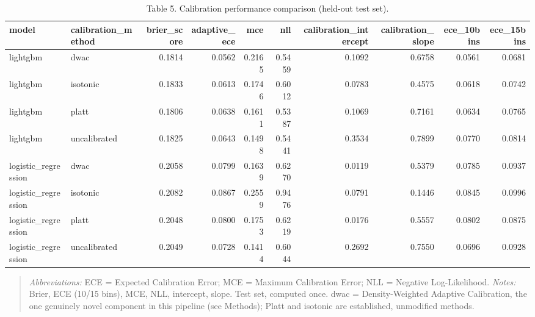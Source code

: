 \begin{table}[htbp]
\centering
\caption{Table 5. Calibration performance comparison (held-out test set).}
\label{table5_calibration_performance_test}
\begin{tabular}{llrrrrrrrr}
\toprule
model & calibration\_method & brier\_score & adaptive\_ece & mce & nll & calibration\_intercept & calibration\_slope & ece\_10bins & ece\_15bins \\
\midrule
lightgbm & dwac & 0.1814 & 0.0562 & 0.2165 & 0.5459 & 0.1092 & 0.6758 & 0.0561 & 0.0681 \\
lightgbm & isotonic & 0.1833 & 0.0613 & 0.1746 & 0.6012 & 0.0783 & 0.4575 & 0.0618 & 0.0742 \\
lightgbm & platt & 0.1806 & 0.0638 & 0.1611 & 0.5387 & 0.1069 & 0.7161 & 0.0634 & 0.0765 \\
lightgbm & uncalibrated & 0.1825 & 0.0643 & 0.1498 & 0.5441 & 0.3534 & 0.7899 & 0.0770 & 0.0814 \\
logistic\_regression & dwac & 0.2058 & 0.0799 & 0.1639 & 0.6270 & 0.0119 & 0.5379 & 0.0785 & 0.0937 \\
logistic\_regression & isotonic & 0.2082 & 0.0867 & 0.2559 & 0.9476 & 0.0791 & 0.1446 & 0.0845 & 0.0996 \\
logistic\_regression & platt & 0.2048 & 0.0800 & 0.1753 & 0.6219 & 0.0176 & 0.5557 & 0.0802 & 0.0875 \\
logistic\_regression & uncalibrated & 0.2049 & 0.0728 & 0.1414 & 0.6044 & 0.2692 & 0.7550 & 0.0696 & 0.0928 \\
\bottomrule
\end{tabular}

\end{table}


\begin{quote}\small
\textit{Abbreviations:} ECE = Expected Calibration Error; MCE = Maximum Calibration Error; NLL = Negative Log-Likelihood.
\textit{Notes:} Brier, ECE (10/15 bins), MCE, NLL, intercept, slope. Test set, computed once. dwac = Density-Weighted Adaptive Calibration, the one genuinely novel component in this pipeline (see Methods); Platt and isotonic are established, unmodified methods.
\end{quote}